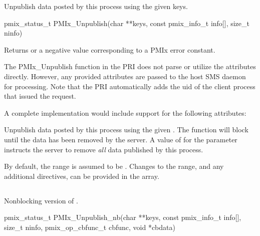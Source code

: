 \summary

Unpublish data posted by this process using the given keys.

\format

\cspecificstart
\begin{codepar}
pmix_status_t
PMIx_Unpublish(char **keys,
               const pmix_info_t info[], size_t ninfo)
\end{codepar}
\cspecificend

\begin{arglist}
\end{arglist}

Returns  or a negative value corresponding to a PMIx error constant.

\priattr
The PMIx_Unpublish function in the \ac{PRI} does not parse or utilize the attributes directly. However, any provided attributes are passed to the host \ac{SMS} daemon for processing. Note that the \ac{PRI} automatically adds the uid of the client process that issued the request.

\optattr
A complete implementation would include support for the following attributes:



\descr

Unpublish data posted by this process using the given .
The function will block until the data has been removed by the server.
A value of  for the  parameter instructs the server to remove \emph{all} data published by this process.

By default, the range is assumed to be .
Changes to the range, and any additional directives, can be provided in the  array.


\subsection{}

\summary

Nonblocking version of .

\format

\cspecificstart
\begin{codepar}
pmix_status_t
PMIx_Unpublish_nb(char **keys,
                  const pmix_info_t info[], size_t ninfo,
                  pmix_op_cbfunc_t cbfunc, void *cbdata)
\end{codepar}
\cspecificend

